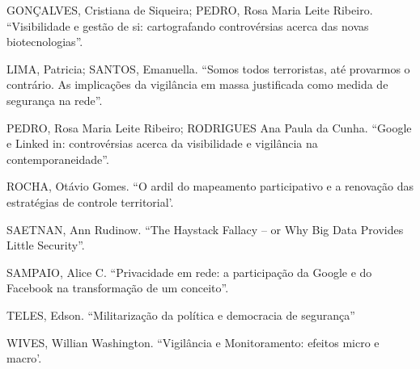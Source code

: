 GONÇALVES, Cristiana de Siqueira; PEDRO, Rosa Maria Leite Ribeiro.
``Visibilidade e gestão de si: cartografando controvérsias acerca das
novas biotecnologias''.

LIMA, Patricia; SANTOS, Emanuella. ``Somos todos terroristas, até
provarmos o contrário. As implicações da vigilância em massa justificada
como medida de segurança na rede''.

PEDRO, Rosa Maria Leite Ribeiro; RODRIGUES Ana Paula da Cunha. ``Google
e Linked in: controvérsias acerca da visibilidade e vigilância na
contemporaneidade''.

ROCHA, Otávio Gomes. ``O ardil do mapeamento participativo e a renovação
das estratégias de controle territorial'.

SAETNAN, Ann Rudinow. ``The Haystack Fallacy -- or Why Big Data Provides
Little Security''.

SAMPAIO, Alice C. ``Privacidade em rede: a participação da Google e do
Facebook na transformação de um conceito''.

TELES, Edson. ``Militarização da política e democracia de segurança''

WIVES, Willian Washington. ``Vigilância e Monitoramento: efeitos micro e
macro'.
